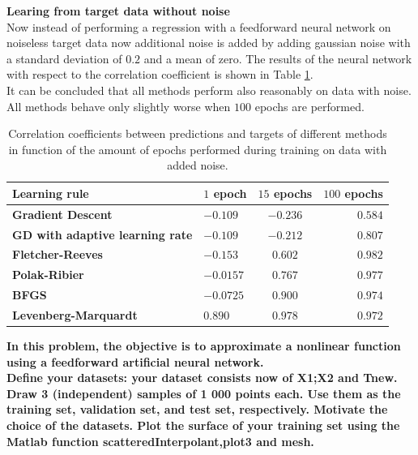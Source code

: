 \documentclass[a4paper,10pt]{article}
\begin{document}
\textbf{Learing from target data without noise}\\
Now instead of performing a regression with a feedforward neural network on noiseless target data now additional noise is added by adding gaussian noise with a standard deviation of $ 0.2 $ and a mean of zero. The results of the neural network with respect to the correlation coefficient is shown in Table \ref{tab:corr_with_noise}.\\

It can be concluded that all methods perform also reasonably on data with noise. All methods behave only slightly worse when $ 100 $ epochs are performed.

\begin{table}
	\centering
	\begin{tabular}{@{}l|lcr@{}} \toprule
		\textbf{Learning rule}    & $ 1 $ epoch & $ 15 $ epochs & $ 100 $ epochs \\\midrule
		\textbf{Gradient Descent}    & $ -0.109 $  & $ -0.236 $  & $ 0.584 $  \\
		\textbf{GD with adaptive learning rate} & $ -0.109 $  & $ -0.212 $  & $ 0.807 $  \\
		\textbf{Fletcher-Reeves} & $ -0.153 $  & $ 0.602 $  & $ 0.982 $  \\
		\textbf{Polak-Ribier} & $ -0.0157 $  & $ 0.767 $  & $ 0.977 $  \\
		\textbf{BFGS} & $ -0.0725 $  & $ 0.900 $  & $ 0.974 $  \\
		\textbf{Levenberg-Marquardt} & $ 0.890 $  & $ 0.978 $  & $ 0.972 $  \\ \bottomrule
	\end{tabular}
	\caption{Correlation coefficients between predictions and targets of  different methods in function of the amount of epochs performed during training on data with added noise.}
	\label{tab:corr_with_noise}
\end{table}

\textbf{In this problem, the objective is to approximate a nonlinear function
	using a feedforward artificial neural network.}\\

\textbf{Define your datasets: your dataset consists now of X1;X2 and Tnew. Draw 3 (independent) samples of 1 000 	points each. Use them as the training set, validation set, and test set, respectively. Motivate the choice of the 	datasets. Plot the surface of your training set using the Matlab function scatteredInterpolant,plot3 	and mesh.}\\
\end{document}

